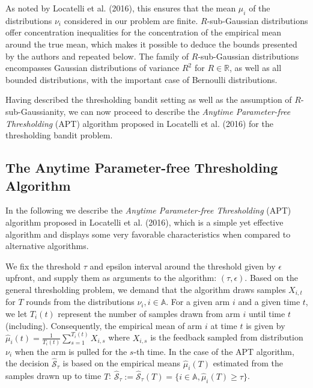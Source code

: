 \documentclass[11pt,]{article}
\begin{document}
As noted by Locatelli et al. (2016), this ensures that the mean
\(\mu_i\) of the distributions \(\nu_i\) considered in our problem are
finite. \(R\)-sub-Gaussian distributions offer concentration
inequalities for the concentration of the empirical mean around the true
mean, which makes it possible to deduce the bounds presented by the
authors and repeated below. The family of \(R\)-sub-Gaussian
distributions encompasses Gaussian distributions of variance \(R^2\) for
\(R \in \mathbb{R}\), as well as all bounded distributions, with the
important case of Bernoulli distributions.

Having described the thresholding bandit setting as well as the
assumption of \(R\)-sub-Gaussianity, we can now proceed to describe the
\emph{Anytime Parameter-free Thresholding} (APT) algorithm proposed in
Locatelli et al. (2016) for the thresholding bandit problem.

\subsection{\texorpdfstring{The Anytime Parameter-free Thresholding
Algorithm
\label{sec:TheAPTAlgorithm}}{The Anytime Parameter-free Thresholding Algorithm }}\label{the-anytime-parameter-free-thresholding-algorithm}

In the following we describe the \emph{Anytime Parameter-free
Thresholding} (APT) algorithm proposed in Locatelli et al. (2016), which
is a simple yet effective algorithm and displays some very favorable
characteristics when compared to alternative algorithms.

We fix the threshold \(\tau\) and epsilon interval around the threshold
given by \(\epsilon\) upfront, and supply them as arguments to the
algorithm: \((\tau, \epsilon)\). Based on the general thresholding
problem, we demand that the algorithm draws samples \(X_{i,t}\) for
\(T\) rounds from the distributions \(\nu_i, i\in \mathbb{A}\). For a
given arm \(i\) and a given time \(t\), we let \(T_i(t)\) represent the
number of samples drawn from arm \(i\) until time \(t\) (including).
Consequently, the empirical mean of arm \(i\) at time \(t\) is given by
\(\hat{\mu}_i(t) = \frac{1}{T_i(t)} \sum_{s=1}^{T_i(t)} X_{i,s}\) where
\(X_{i,s}\) is the feedback sampled from distribution \(\nu_i\) when the
arm is pulled for the \(s\)-th time. In the case of the APT algorithm,
the decision \(\hat{\mathcal{S}}_{\tau}\) is based on the empirical
means \(\hat{\mu}_i(T)\) estimated from the samples drawn up to time
\(T\):
\(\hat{\mathcal{S}}_{\tau} := \hat{\mathcal{S}}_{\tau}(T) = \{i \in \mathbb{A}, \hat{\mu}_i(T) \geq \tau\}\).
\end{document}
